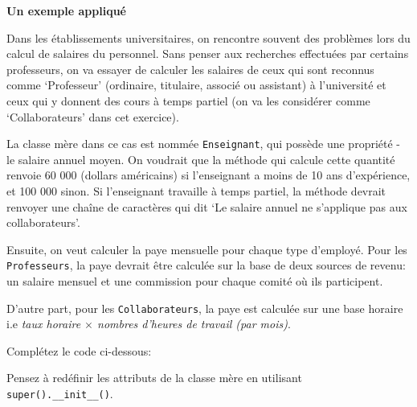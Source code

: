 \begin{Exercice}[30 minutes]\textbf{Un exemple appliqué}
    
    Dans les établissements universitaires, on rencontre souvent des problèmes lors du calcul de salaires du personnel. Sans penser aux recherches effectuées par certains professeurs, on va essayer de calculer les salaires de ceux qui sont reconnus comme `Professeur' (ordinaire, titulaire, associé ou assistant) à l'université et ceux qui y donnent des cours à temps partiel (on va les considérer comme `Collaborateurs' dans cet exercice).
    
    La classe mère dans ce cas est nommée \lstinline{Enseignant}, qui possède une propriété - le salaire annuel moyen. On voudrait que la méthode qui calcule cette quantité renvoie 60 000 (dollars américains) si l'enseignant a moins de 10 ans d'expérience, et 100 000 sinon. Si l'enseignant travaille à temps partiel, la méthode devrait renvoyer une chaîne de caractères qui dit `Le salaire annuel ne s'applique pas aux collaborateurs'.
    
    Ensuite, on veut calculer la paye mensuelle pour chaque type d'employé. Pour les \lstinline{Professeurs}, la paye devrait être calculée sur la base de deux sources de revenu: un salaire mensuel et une commission pour chaque comité où ils participent. 
    
    D'autre part, pour les \lstinline{Collaborateurs}, la paye est calculée sur une base horaire i.e \textit{taux horaire $\times$ nombres d'heures de travail (par mois)}.
    
    
    Complétez le code ci-dessous:
    
     
    
    \begin{conseil}
    Pensez à redéfinir les attributs de la classe mère en utilisant \lstinline{super().__init__()}.
    \end{conseil}
    
    \begin{solution}
     
    \end{solution}
    \end{Exercice}

